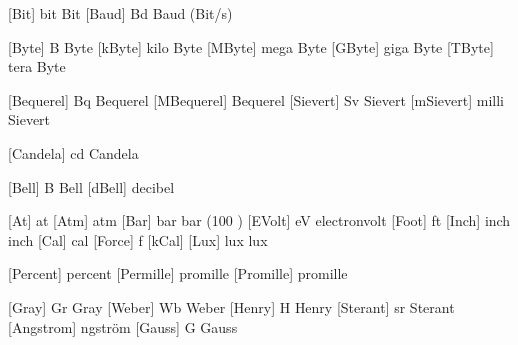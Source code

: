 
 [Bit]   {bit}       {Bit}
 [Baud]  {Bd}        {Baud (Bit/s)}

 [Byte]  {B}           {Byte}
 [kByte] {\Kilo \Byte} {kilo Byte}
 [MByte] {\Mega \Byte} {mega Byte}
 [GByte] {\Giga \Byte} {giga Byte}
 [TByte] {\Tera \Byte} {tera Byte}


 [Bequerel]  {Bq}              {Bequerel}
 [MBequerel] {\Mega \Bequerel} {Bequerel}
 [Sievert]   {Sv}              {Sievert}
 [mSievert]  {\Milli \Sievert} {milli Sievert}


 [Candela] {cd} {Candela}


 [Bell]  {B}           {Bell}
 [dBell] {\Deci \Bell} {decibel}


 [At]    {at}         {}
 [Atm]   {atm}        {}
 [Bar]   {bar}        {bar (100 \Kilo \Pascal)}
 [EVolt] {eV}         {electronvolt}
 [Foot]  {ft}         {}
 [Inch]  {inch}       {inch}
 [Cal]   {cal}        {}
 [Force] {f}          {}
 [kCal]  {\Kilo \Cal} {}
 [Lux]   {lux}        {lux}


\def\xPercent {\dimensionaddfix{\percent }}
\def\xPromille{\dimensionaddfix{\promille}}

 [Percent]  {\xPercent } {percent}
 [Permille] {\xPromille} {promille}
 [Promille] {\xPromille} {promille}


 [Gray]     {Gr}  {Gray}
 [Weber]    {Wb}  {Weber}
 [Henry]    {H}   {Henry}
 [Sterant]  {sr}  {Sterant}
 [Angstrom] {\hbox{\Aring}} {\Aring ngstr\"om}
 [Gauss]    {G}   {Gauss}

